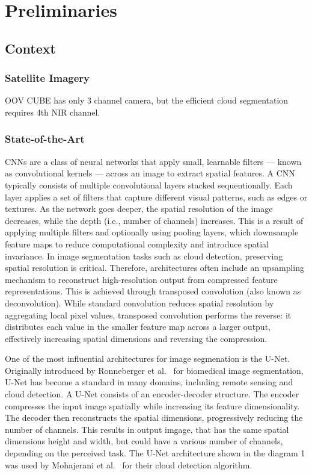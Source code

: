 {

\setlength{\parskip}{1em}

\chapter{Preliminaries}

\section{Context}
\subsection{Satellite Imagery}
OOV CUBE has only 3 channel camera, but the efficient cloud segmentation requires 4th NIR channel. 
\subsection{State-of-the-Art}
\label{subsec:stateoftheart}

CNNs are a class of neural networks that apply small, learnable filters --- known as convolutional kernels --- across an image to extract spatial features. A CNN typically consists of multiple convolutional layers stacked sequentionally. Each layer applies a set of filters that capture different visual patterns, such as edges or textures. As the network goes deeper, the spatial resolution of the image decreases, while the depth (i.e., number of channels) increases. This is a result of applying multiple filters and optionally using pooling layers, which downsample feature maps to reduce computational complexity and introduce spatial invariance.
In image segmentation tasks such as cloud detection, preserving spatial resolution is critical. Therefore, architectures often include an upsampling mechanism to reconstruct high-resolution output from compressed feature representations. This is achieved through transposed convolution (also known as deconvolution). While standard convolution reduces spatial resolution by aggregating local pixel values, transposed convolution performs the reverse: it distributes each value in the smaller feature map across a larger output, effectively increasing spatial dimensions and reversing the compression.

One of the most influential architectures for image segmenation is the U-Net. Originally introduced by Ronneberger et al.~\cite{ronneberger2015u} for biomedical image segmentation, U-Net has become a standard in many domains, including remote sensing and cloud detection. A U-Net consists of an encoder-decoder structure. The encoder compresses the input image spatially while increasing its feature dimensionality. The decoder then reconstructs the spatial dimensions, progressively reducing the number of channels. This results in output imgage, that has the same spatial dimensions height and width, but could have a various number of channels, depending on the perceived task. The U-Net architecture shown in the diagram 1 was used by Mohajerani et al.~\cite{mohajerani2019cloudnet}  for their cloud detection algorithm.

}
